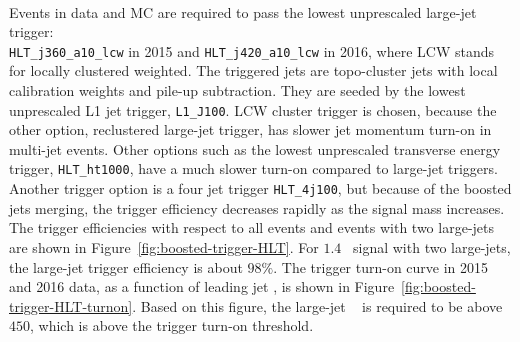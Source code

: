 \paragraph{}
Events in data and MC are required to pass the lowest unprescaled large-\R jet trigger: \\
\verb|HLT_j360_a10_lcw| in 2015 and \verb|HLT_j420_a10_lcw| in 2016, where LCW stands for locally clustered weighted. 
The triggered jets are topo-cluster jets with local calibration weights and pile-up subtraction.
They are seeded by the lowest unprescaled L1 jet trigger, \texttt{L1\_J100}. 
LCW cluster trigger is chosen, because the other option, reclustered large-\R jet trigger, has slower jet momentum turn-on in multi-jet events. 
Other options such as the lowest unprescaled transverse energy trigger, \verb|HLT_ht1000|, have a much slower turn-on compared to large-\R jet triggers.
Another trigger option is a four jet trigger \verb|HLT_4j100|, but because of the boosted jets merging, the trigger efficiency decreases rapidly as the signal mass increases. 
The trigger efficiencies with respect to all events and events with two large-\R jets are shown in Figure~\ref{fig:boosted-trigger-HLT}.
For $1.4$\TeV~ signal with two large-\R jets, the large-\R jet trigger efficiency is about $98\%$.
The trigger turn-on curve in 2015 and 2016 data, as a function of leading jet \pt, is shown in Figure~\ref{fig:boosted-trigger-HLT-turnon}.
Based on this figure, the large-\R jet \pt~ is required to be above $450$\GeV, which is above the trigger turn-on threshold.

